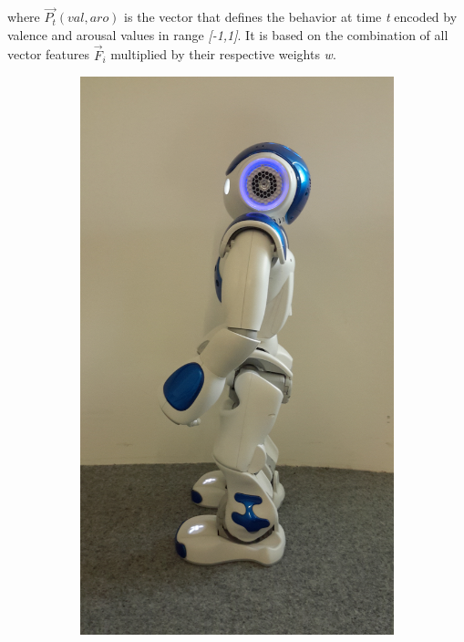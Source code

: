 \documentclass[a4paper, 10pt, conference]{ieeeconf}      %
\begin{document}
where $\vec{P_{t}}(val,aro)$ is the vector that defines the behavior at time \textit{t} encoded by valence and arousal values in range \textit{[-1,1]}. It is based on the combination of all vector features $ \vec{F}_{i} $ multiplied by their respective weights \textit{w}.

\begin{figure}
        \centering        
        \begin{subfigure}[b]{0.18\textwidth}
                \includegraphics[width=\textwidth]{../dissertation/figures/neutral.jpg}

\end{subfigure}
\end{figure}
\end{document}
